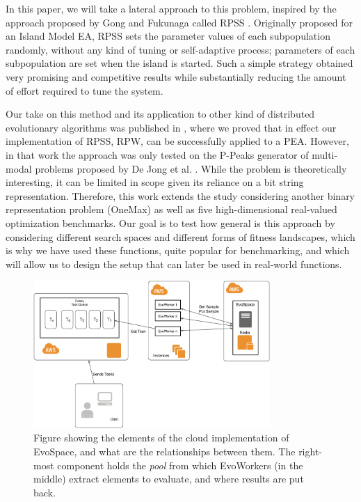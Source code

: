 \documentclass[conference]{IEEEtran}
\begin{document}
In this paper, we will take a lateral approach to this problem,
inspired by the approach proposed by Gong and Fukunaga called RPSS
\cite{fuku1,fuku2}.  Originally proposed for an Island Model EA, RPSS
sets the parameter values of each subpopulation randomly, without any
kind of tuning or self-adaptive process; parameters of each
subpopulation are set when the island
is started. Such a simple strategy obtained very promising and
competitive results while substantially reducing the amount of effort
required to tune the system.

Our take on this method and its application to other kind of
distributed evolutionary algorithms was published in
\cite{LNCS86720702}, where we proved that in effect our implementation
of RPSS, RPW, can be successfully applied to a PEA. However, in that
work the approach was only tested on the P-Peaks generator of
multi-modal problems proposed by De Jong et al. \cite{Jong:PS97}.
While the problem is theoretically interesting, it can be limited in
scope given its reliance on a bit string representation. Therefore,
this work extends the study considering another binary representation
problem (OneMax) as well as five high-dimensional real-valued
optimization benchmarks. Our goal is to test how general is this
approach by considering different search spaces and different forms of
fitness landscapes, which is why we have used these functions, quite
popular for benchmarking, and which will allow us to design the setup
that can later be used in real-world functions.

\begin{figure}[h!tbp]
    \centering
        \includegraphics[width=9cm]{img/EvoSpaceAWS.png}
    \caption{Figure showing the elements of the cloud implementation of EvoSpace, and what are the relationships between them. The right-most component holds the {\em pool} from which EvoWorkers (in the middle) extract elements to evaluate, and where results are put back.}
    \label{fig:evospace}
  \end{figure}
%
\end{document}
